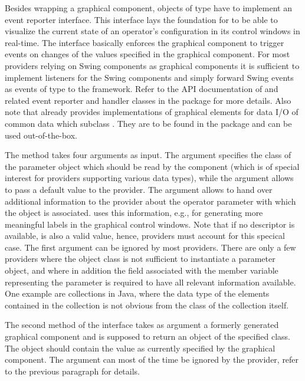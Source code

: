 Besides wrapping a graphical component, objects of type
 have to implement an event reporter interface. This
interface lays the foundation for \alida to be able to visualize the current state of an operator's configuration in its control windows in real-time. The interface
basically enforces the graphical component to trigger events on changes of the values specified
in the graphical component. For most providers relying on Swing components as graphical components
it is sufficient to implement listeners for the Swing components and simply forward Swing events
as \alida events of type  to the framework.
Refer to the API documentation of
and related event reporter and handler classes in the package
 for more details. Also note that
\alida already provides implementations of graphical elements for data
I/O of common data which subclass . They are to be
found in the package  and can be used
out-of-the-box.

The method  takes four
arguments as input.
The argument  specifies the class of the parameter object which 
should be read by the component (which is of special interest for providers supporting various
data types), while the  argument allows to pass a default value to
the provider. The argument  allows to hand over additional
information to the provider about the operator parameter with which the object is associated. \alida uses this information, e.g., for 
generating more meaningful labels in the graphical control windows. Note that if no descriptor is
available,  is also a valid value, hence, providers must account
for this specical case.
The first argument  can be ignored by most
providers. There are only a few providers where the object class is not sufficient 
to instantiate a parameter object, and where in addition the field associated
with the member variable representing the parameter is required to have all relevant information available. 
One example are collections in Java, where the data type of the
elements contained in the collection is not obvious from the class of the collection itself.

The second method  of the  interface takes as argument a 
formerly generated graphical
component  and is supposed to return an object of the
specified class. The object should
contain the value as currently specified by the graphical component.
The  argument can most of the time be ignored by the provider,
refer to the previous paragraph for details. 

